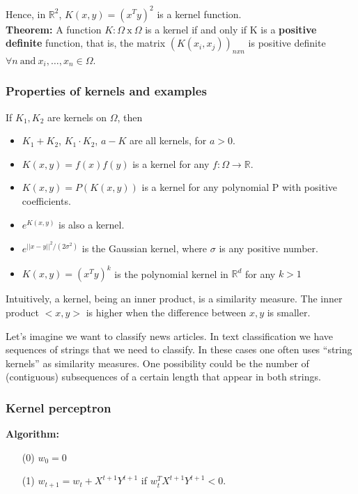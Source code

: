 \documentclass[11pt, english]{article}
\begin{document}
Hence, in $\mathbb{R}^2$, $K(x,y) = (x^Ty)^2$ is a kernel function.\\

\textbf{Theorem:} A function $K : \Omega\ \text{x}\ \Omega$ is a kernel if and only if K is a \textbf{positive definite} function, that is, the matrix $(K(x_i,x_j))_{n x n}$ is positive definite $\forall n\ \text{and}\ x_i, \dots, x_n \in \Omega$.

\subsubsection{Properties of kernels and examples}%

If $K_1, K_2$ are kernels on $\Omega$, then 
\begin{itemize}
	\item $K_1 + K_2$, $K_1 \cdot K_2$, $a - K$ are all kernels, for $a>0$.
	\item $K(x,y) = f(x)f(y)$ is a kernel for any $f: \Omega \rightarrow \mathbb{R}$.
	\item $K(x,y) = P(K(x,y))$ is a kernel for any polynomial P with positive coefficients.
	\item $e^{K(x,y)}$ is also a kernel.
	\item $e^{||x-y||^2 /(2\sigma^2)}$ is the Gaussian kernel, where $\sigma$ is any positive number.
	\item $K(x,y) = (x^Ty)^k$ is the polynomial kernel in $\mathbb{R}^d$ for any $k>1$
\end{itemize}

Intuitively, a kernel, being an inner product, is a similarity measure. The inner product $<x,y>$ is higher when the difference between $x,y$ is smaller.

Let's imagine we want to classify news articles. In text classification we have sequences of strings that we need to classify. In these cases one often uses ``string kernels'' as similarity measures. One possibility could be the number of (contiguous) subsequences of a certain length that appear in both strings.

\subsubsection{Kernel perceptron}%

\textbf{Algorithm:}
\begin{enumerate}
	\item[(0)] $w_0 = 0$
	\item[(1)] $w_{t+1} = w_t + X^{t+1}Y^{t+1}$ if $w^T_t X^{t+1}Y^{t+1}<0$. 
\end{enumerate}
\end{document}
